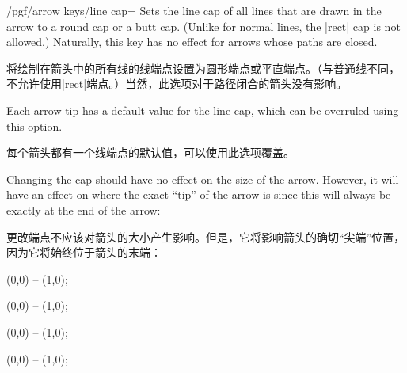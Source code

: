 \begin{key}{/pgf/arrow keys/line cap=}
    Sets the line cap of all lines that are drawn in the arrow to a round cap
    or a butt cap. (Unlike for normal lines, the |rect| cap is not allowed.)
    Naturally, this key has no effect for arrows whose paths are closed.

    将绘制在箭头中的所有线的线端点设置为圆形端点或平直端点。（与普通线不同，不允许使用|rect|端点。）当然，此选项对于路径闭合的箭头没有影响。

    Each arrow tip has a default value for the line cap, which can be overruled
    using this option.

    每个箭头都有一个线端点的默认值，可以使用此选项覆盖。

    Changing the cap should have no effect on the size of the arrow. However,
    it will have an effect on where the exact ``tip'' of the arrow is since
    this will always be exactly at the end of the arrow:
    
    更改端点不应该对箭头的大小产生影响。但是，它将影响箭头的确切“尖端”位置，因为它将始终位于箭头的末端：
\begin{codeexample}[width=3cm,preamble={\usetikzlibrary{arrows.meta}}]
\tikz [line width=2mm]
  \draw [arrows = {-Computer Modern Rightarrow[line cap=butt]}]
        (0,0) -- (1,0);
\end{codeexample}
\begin{codeexample}[width=3cm,preamble={\usetikzlibrary{arrows.meta}}]
\tikz [line width=2mm]
  \draw [arrows = {-Computer Modern Rightarrow[line cap=round]}]
        (0,0) -- (1,0);
\end{codeexample}
\begin{codeexample}[width=3cm,preamble={\usetikzlibrary{arrows.meta}}]
\tikz [line width=2mm]
  \draw [arrows = {-Bracket[reversed,line cap=butt]}]
        (0,0) -- (1,0);
\end{codeexample}
\begin{codeexample}[width=3cm,preamble={\usetikzlibrary{arrows.meta}}]
\tikz [line width=2mm]
  \draw [arrows = {-Bracket[reversed,line cap=round]}]
        (0,0) -- (1,0);
\end{codeexample}
\end{key}

